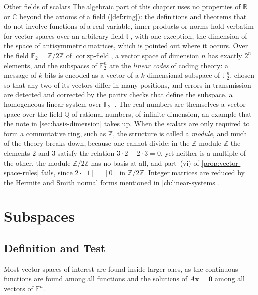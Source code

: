 \begin{note}{Other fields of scalars}
The algebraic part of this chapter uses no properties of $\mathbb R$ or $\mathbb C$ beyond the axioms of a field (\cref{def:ring}): the definitions and theorems that do not involve functions of a real variable, inner products or norms hold verbatim for vector spaces over an arbitrary field $\mathbb F$, with one exception, the dimension of the space of antisymmetric matrices, which is pointed out where it occurs. Over the field $\mathbb F_2=\mathbb Z/2\mathbb Z$ of \cref{cor:zp-field}, a vector space of dimension $n$ has exactly $2^n$ elements, and the subspaces of $\mathbb F_2^n$ are the \emph{linear codes} of coding theory: a message of $k$ bits is encoded as a vector of a $k$-dimensional subspace of $\mathbb F_2^n$, chosen so that any two of its vectors differ in many positions, and errors in transmission are detected and corrected by the parity checks that define the subspace, a homogeneous linear system over $\mathbb F_2$~\cite{macwilliams1977}. The real numbers are themselves a vector space over the field $\mathbb Q$ of rational numbers, of infinite dimension, an example that the note in \cref{sec:basis-dimension} takes up. When the scalars are only required to form a commutative ring, such as $\mathbb Z$, the structure is called a \emph{module}, and much of the theory breaks down, because one cannot divide: in the $\mathbb Z$-module $\mathbb Z$ the elements $2$ and $3$ satisfy the relation $3\cdot2-2\cdot3=0$, yet neither is a multiple of the other, the module $\mathbb Z/2\mathbb Z$ has no basis at all, and part~(vi) of \cref{prop:vector-space-rules} fails, since $2\cdot[1]=[0]$ in $\mathbb Z/2\mathbb Z$. Integer matrices are reduced by the Hermite and Smith normal forms mentioned in \cref{ch:linear-systems}.
\end{note}

\section{Subspaces}
\label{sec:subspaces}

\subsection{Definition and Test}

Most vector spaces of interest are found inside larger ones, as the continuous functions are found among all functions and the solutions of $A\mathbf x=\mathbf 0$ among all vectors of $\mathbb F^n$.

